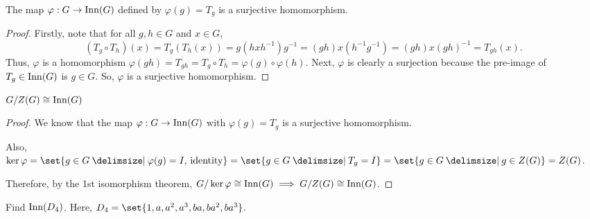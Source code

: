 \documentclass[11pt]{penrose}
\begin{document}
\begin{nthm}
    The map $\varphi: G \to \operatorname{Inn}(G)$ defined by $\varphi(g) = T_{g}$ is a surjective homomorphism.
\end{nthm}
\begin{proof}
    Firstly, note that for all $g,h \in G$ and $x \in G$,
    \begin{equation*}
        (T_{g} \circ T_{h})(x)
        = T_{g} ( T_{h}(x) )
        = g ( hxh^{-1} ) g^{-1}
        = (gh) x (h^{-1}g^{-1})
        = (gh) x (gh)^{-1}
        = T_{gh} (x).
    \end{equation*}
    Thus, $\varphi$ is a homomorphism $\varphi(gh) = T_{gh} = T_{g} \circ T_{h} = \varphi(g) \circ \varphi(h)$. Next, $\varphi$ is clearly a surjection because the pre-image of $T_{g} \in \operatorname{Inn}(G)$ is $g \in G$. So, $\varphi$ is a surjective homomorphism.
\end{proof}

\begin{nthm}
    $G/Z(G) \mathrel{\cong} \operatorname{Inn}(G)$
\end{nthm}
\begin{proof}
    We know that the map $\varphi : G \to \operatorname{Inn}(G)$ with $\varphi(g) = T_{g}$ is a surjective homomorphism.

    Also, $\ker\varphi = \set{g \in G \st \varphi(g) = I,\, \text{identity}} = \set{g \in G \st T_{g} = I} = \set{g \in G \st g \in Z(G)} = Z(G)$.

    Therefore, by the 1st isomorphism theorem, $G / \ker\varphi \mathrel{\cong} \operatorname{Inn}(G) \implies G / Z(G) \mathrel{\cong} \operatorname{Inn}(G)$.
\end{proof}

\begin{nex}
    Find $\operatorname{Inn}(D_{4})$. Here, $D_{4} = \set{1, a, a^{2}, a^{3}, ba, ba^{2}, ba^{3}}$.
\end{nex}
\end{document}
